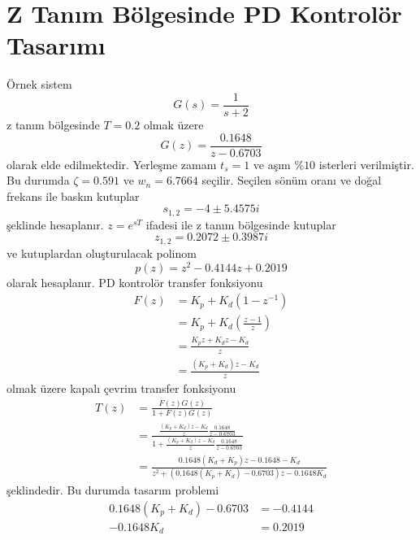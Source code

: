 \chapter{Z Tanım Bölgesinde PD Kontrolör Tasarımı}
Örnek sistem
\begin{equation}
    G(s)=\frac{1}{s+2}
\end{equation}
z tanım bölgesinde $T=0.2$ olmak üzere
\begin{equation}
    G(z)=\frac{0.1648}{z-0.6703}
\end{equation}
olarak elde edilmektedir. Yerleşme zamanı $t_s=1$ ve aşım $\%10$ isterleri verilmiştir. Bu durumda $\zeta=0.591$ ve $w_n=6.7664$ seçilir. Seçilen sönüm oranı ve doğal frekans ile baskın kutuplar
\begin{equation}
    s_{1,2}=-4 \pm 5.4575i
\end{equation}
şeklinde hesaplanır. $z=e^{sT}$ ifadesi ile z tanım bölgesinde kutuplar
\begin{equation}
    z_{1,2}=0.2072 \pm 0.3987i
\end{equation}
ve kutuplardan oluşturulacak polinom
\begin{equation}
    p(z)=z^2-0.4144 z+0.2019
\end{equation}
olarak hesaplanır. PD kontrolör transfer fonksiyonu
\begin{equation}
\begin{split}
    F(z)&=K_p+K_d(1-z^{-1})\\
    &=K_p+K_d(\frac{z-1}{z})\\
    &=\frac{K_pz+K_dz-K_d}{z}\\
    &=\frac{(K_p+K_d)z-K_d}{z}
\end{split}
\end{equation}
olmak üzere kapalı çevrim transfer fonksiyonu
\begin{equation}
    \begin{split}
        T(z)&=\frac{F(z)G(z)}{1+F(z)G(z)}\\
        &=\frac{\frac{(K_p+K_d)z-K_d}{z}\frac{0.1648}{z-0.6703}}{1+\frac{(K_p+K_d)z-K_d}{z}\frac{0.1648}{z-0.6703}}\\
        &=\frac{0.1648(K_d+K_p)z-0.1648-K_d}{z^2+(0.1648(K_p+K_d)-0.6703)z-0.1648K_d}
    \end{split}
\end{equation}
şeklindedir. Bu durumda tasarım problemi
\begin{equation}
    \begin{split}
        0.1648(K_p+K_d)-0.6703&=-0.4144\\
        -0.1648K_d&=0.2019
    \end{split}
\end{equation}
